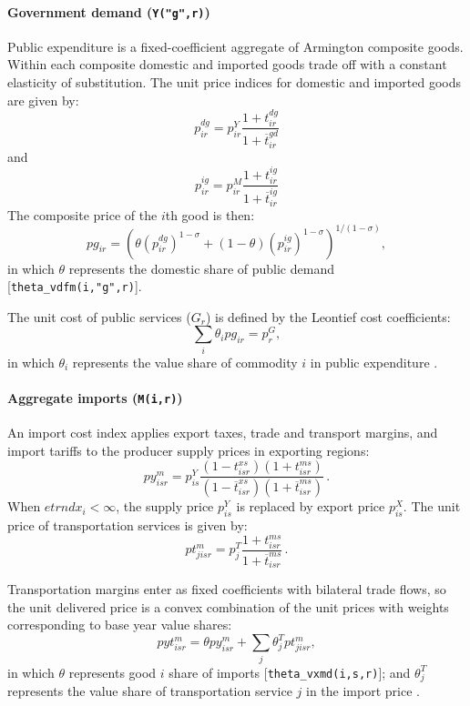 \paragraph{\bf Government demand (\texttt{Y("g",r)})}

Public expenditure is a fixed-coefficient aggregate of Armington composite goods.
Within each composite domestic and imported goods trade off with a constant elasticity of substitution.
The unit price indices for domestic and imported goods are given by:
$$p^{dg}_{ir} = p^Y_{ir} \frac{1+t^{dg}_{ir}}{1+\overline{t}^{gd}_{ir}} $$
and
$$p^{ig}_{ir} = p^M_{ir} \frac{1+t^{ig}_{ir}}{1+\overline{t}^{ig}_{ir}}$$
The composite price of the $i$th good is then:
$$pg_{ir} = \left( \theta (p^{dg}_{ir})^{1-\sigma} + (1-\theta)
(p^{ig}_{ir})^{1-\sigma} \right)^{1/(1-\sigma)},$$ in which $\theta$ represents the domestic share of public demand [{\small \texttt{theta\_vdfm(i,"g",r)}}].

The unit cost of public services ($G_{r}$) is defined by the Leontief cost coefficients:
\begin{equation}
\sum_i \theta_i pg_{ir}  = p^G_r,
\end{equation}
in which $\theta_i$ represents the value share of commodity $i$ in public expenditure \hfill {}.

\paragraph{\bf Aggregate imports (\texttt{M(i,r)})}

An import cost index applies export taxes, trade and transport margins, and import tariffs to the producer supply prices in exporting regions:
$$py^m_{isr} = p^Y_{is}
\frac{(1-t^{xs}_{isr})(1+t^{ms}_{isr})} {(1-\overline{t}^{xs}_{isr})(1+\overline{t}^{ms}_{isr})}\,.$$ When $\textit{etrndx}_{i}<\infty$, the supply price $p^Y_{is}$ is replaced by export price $p^X_{is}$.
The unit price of transportation services is given by: $$pt^m_{jisr} = p^T_j \frac{1+t^{ms}_{isr}}{1+\overline{t}^{ms}_{isr}}\,.$$

Transportation margins enter as fixed coefficients with bilateral trade flows, so the unit delivered price is a convex combination of the unit prices with weights corresponding to base year value shares:
$$pyt^m_{isr} = \theta py^m_{isr} + \sum_j \theta^T_j pt^m_{jisr},$$
in which $\theta$ represents good $i$ share of imports [{\small \texttt{theta\_vxmd(i,s,r)}}]; and $\theta^T_j$ represents the value share of transportation service $j$ in the import price \hfill {}.

